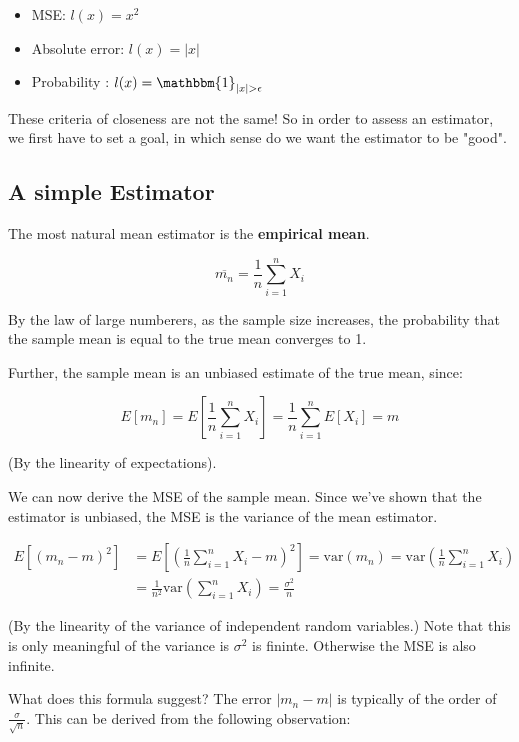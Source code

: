 \documentclass[12pt, authoryear]{elsarticle}
\begin{document}
\begin{itemize}
\item MSE: $l(x) = x^2$
\item Absolute error: $l(x) = |x|$
\item Probability : $l(x) = \mathbbm{1}_{|x|>\epsilon}$
\end{itemize}

These criteria of closeness are not the same! So in order to assess an estimator, we first have to set a goal, in which sense do we want the estimator to be "good". 

\subsection{A simple Estimator}

The most natural mean estimator is the \textbf{empirical mean}.

$$ \overline{m_n} = \frac{1}{n} \sum_{i=1}^{n} X_i $$

By the law of large numberers, as the sample size increases, the probability that the sample mean is equal to the true mean converges to 1. 

Further, the sample mean is an unbiased estimate of the true mean, since:

$$E[m_n] =  E[\frac{1}{n} \sum_{i=1}^{n} X_i] = \frac{1}{n}\sum_{i=1}^{n} E[X_i] = m$$

(By the linearity of expectations). 

We can now derive the MSE of the sample mean. Since we've shown that the estimator is unbiased, the MSE is the variance of the mean estimator. 


\begin{equation*} 
\begin{split}
E[(m_n -m)^2] & = E[(\frac{1}{n} \sum_{i=1}^{n}X_i -m)^2] = \text{var}(m_n) = \text{var}(\frac{1}{n} \sum_{i=1}^{n}X_i) \\ 
&= \frac{1}{n^2} \text{var}(\sum_{i=1}^{n} X_i) = \frac{\sigma^2}{n}
\end{split}
\end{equation*}

(By the linearity of the variance of independent random variables.)
Note that this is only meaningful of the variance is $\sigma^2$ is fininte. Otherwise the MSE is also infinite. 

What does this formula suggest? The error $|m_n - m |$ is typically of the order of $\frac{\sigma}{\sqrt{n}}$. This can be derived from the following observation:
\end{document}
